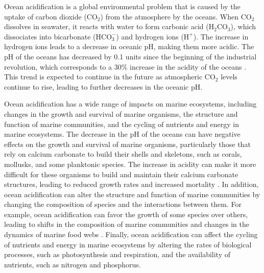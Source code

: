 Ocean acidification is a global environmental problem that is caused by the
uptake of carbon dioxide (CO$_2$) from the atmosphere by the oceans. When
CO$_2$ dissolves in seawater, it reacts with water to form carbonic acid
($\textrm{H}_2\textrm{CO}_3$), which dissociates into bicarbonate
($\textrm{HCO}_3^-$) and hydrogen ions ($\textrm{H}^+$). The increase in
hydrogen ions leads to a decrease in oceanic pH, making them more
acidic. The pH of the oceans has decreased by 0.1 units since the beginning
of the industrial revolution, which corresponds to a 30\% increase in the
acidity of the oceans \cite{Orr2005}. This trend is expected to continue in the
future as atmospheric CO$_2$ levels continue to rise, leading to further
decreases in the oceanic pH.

Ocean acidification has a wide range of impacts on marine ecosystems,
including changes in the growth and survival of marine organisms, the
structure
and function of marine communities, and the cycling of nutrients and energy
in
marine ecosystems. The decrease in the pH of the oceans can have negative
effects on the growth and survival of marine organisms, particularly those
that
rely on calcium carbonate to build their shells and skeletons, such as
corals,
mollusks, and some planktonic species. The increase in acidity can make it
more
difficult for these organisms to build and maintain their calcium carbonate
structures, leading to reduced growth rates and increased mortality
\cite{kroeker2013impacts}. In addition, ocean acidification can alter the
structure and function of marine communities by changing the composition of
species and the interactions between them. For example, ocean acidification
can
favor the growth of some species over others, leading to shifts in the
composition of marine communities and changes in the dynamics of marine food
webs \cite{hendriks2015biological}. Finally, ocean acidification can affect
the
cycling of nutrients and energy in marine ecosystems by altering the rates of
biological processes, such as photosynthesis and respiration, and the
availability of nutrients, such as nitrogen and phosphorus.

